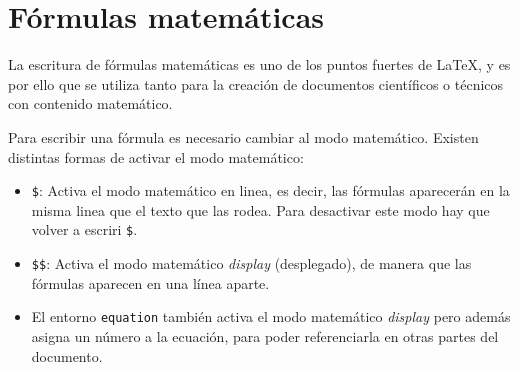 \documentclass[
  a4paper,
]{scrreport}
\theoremstyle{definition}
\theoremstyle{remark}
\begin{document}

\chapter{Fórmulas matemáticas}\label{fuxf3rmulas-matemuxe1ticas}

La escritura de fórmulas matemáticas es uno de los puntos fuertes de
\LaTeX, y es por ello que se utiliza tanto para la creación de
documentos científicos o técnicos con contenido matemático.

Para escribir una fórmula es necesario cambiar al modo matemático.
Existen distintas formas de activar el modo matemático:

\begin{itemize}
\item
  \texttt{\$}: Activa el modo matemático en linea, es decir, las
  fórmulas aparecerán en la misma linea que el texto que las rodea. Para
  desactivar este modo hay que volver a escriri \texttt{\$}.
\item
  \texttt{\$\$}: Activa el modo matemático \emph{display} (desplegado),
  de manera que las fórmulas aparecen en una línea aparte.
\item
  El entorno \texttt{equation} también activa el modo matemático
  \emph{display} pero además asigna un número a la ecuación, para poder
  referenciarla en otras partes del documento.
\end{itemize}
\end{document}
